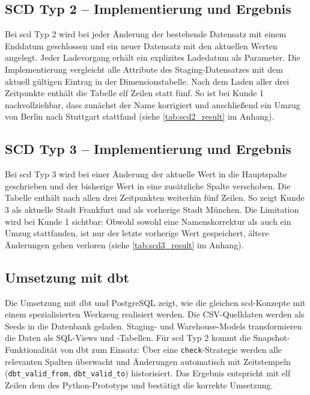 \documentclass[a4paper,11pt]{article}
\begin{document}
\subsection{SCD Typ 2 -- Implementierung und Ergebnis}
Bei \gls{scd} Typ 2 wird bei jeder Änderung der bestehende Datensatz mit einem Enddatum geschlossen 
und ein neuer Datensatz mit den aktuellen Werten angelegt. Jeder Ladevorgang erhält ein explizites 
Ladedatum als Parameter. Die Implementierung vergleicht alle Attribute des Staging-Datensatzes mit 
dem aktuell gültigen Eintrag in der Dimensionstabelle. Nach dem Laden aller drei Zeitpunkte enthält 
die Tabelle elf Zeilen statt fünf. So ist bei Kunde 1 nachvollziehbar, dass zunächst der Name korrigiert 
und anschließend ein Umzug von Berlin nach Stuttgart stattfand (siehe \cref{tab:scd2_result} im Anhang).

\subsection{SCD Typ 3 -- Implementierung und Ergebnis}
Bei \gls{scd} Typ 3 wird bei einer Änderung der aktuelle Wert in die Hauptspalte geschrieben und der bisherige 
Wert in eine zusätzliche Spalte verschoben. Die Tabelle enthält nach allen drei Zeitpunkten weiterhin fünf Zeilen. 
So zeigt Kunde 3 als aktuelle Stadt Frankfurt und als vorherige Stadt München. Die Limitation wird bei Kunde 1 sichtbar: 
Obwohl sowohl eine Namenskorrektur als auch ein Umzug stattfanden, ist nur der letzte vorherige Wert gespeichert, ältere Änderungen gehen verloren (siehe \cref{tab:scd3_result} im Anhang).

\subsection{Umsetzung mit dbt}
Die Umsetzung mit \gls{dbt} und PostgreSQL zeigt, wie die gleichen \gls{scd}-Konzepte mit einem spezialisierten 
Werkzeug realisiert werden. Die CSV-Quelldaten werden als Seeds in die Datenbank geladen. Staging- und Warehouse-Models 
transformieren die Daten als SQL-Views und -Tabellen. Für \gls{scd} Typ 2 kommt die Snapshot-Funktionalität von dbt zum Einsatz: 
Über eine \texttt{check}-Strategie werden alle relevanten Spalten überwacht und Änderungen automatisch mit 
Zeitstempeln (\texttt{dbt\_valid\_from}, \texttt{dbt\_valid\_to}) historisiert. Das Ergebnis entspricht 
mit elf Zeilen dem des Python-Prototyps und bestätigt die korrekte Umsetzung.

\end{document}
